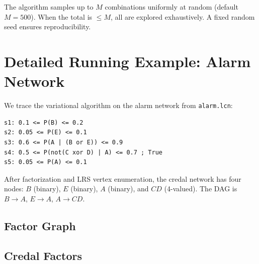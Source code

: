 \documentclass[11pt]{article}
\begin{document}
The algorithm samples up to $M$ combinations uniformly at random (default $M = 500$).
When the total is $\leq M$, all are explored exhaustively. A fixed random seed
ensures reproducibility.

\section{Detailed Running Example: Alarm Network}

We trace the variational algorithm on the alarm network from \texttt{alarm.lcn}:
\begin{verbatim}
s1: 0.1 <= P(B) <= 0.2
s2: 0.05 <= P(E) <= 0.1
s3: 0.6 <= P(A | (B or E)) <= 0.9
s4: 0.5 <= P(not(C xor D) | A) <= 0.7 ; True
s5: 0.05 <= P(A) <= 0.1
\end{verbatim}

After factorization and LRS vertex enumeration, the credal network has four nodes:
$B$ (binary), $E$ (binary), $A$ (binary), and $CD$ (4-valued). The DAG is
$B \to A$, $E \to A$, $A \to CD$.

\subsection{Factor Graph}

\begin{center}
\end{center}

\subsection{Credal Factors}
\end{document}
